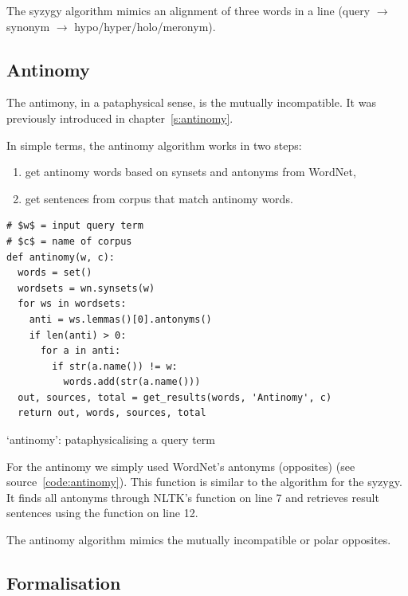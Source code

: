 The syzygy algorithm mimics an alignment of three words in a line (query $\to$ synonym $\to$ hypo/hyper/holo/meronym).


\subsection{Antinomy}
\label{s:antinomyalgo}

The antimony, in a pataphysical sense, is the mutually incompatible. It was previously introduced in chapter~\ref{s:antinomy}.

In simple terms, the antinomy algorithm works in two steps:
\begin{enumerate}
  \item get antinomy words based on synsets and antonyms from WordNet,
  \item get sentences from corpus that match antinomy words.
\end{enumerate}

\begin{listing}[!htbp] %
  \begin{verbatim}
# $w$ = input query term
# $c$ = name of corpus
def antinomy(w, c):
  words = set()
  wordsets = wn.synsets(w)
  for ws in wordsets:
    anti = ws.lemmas()[0].antonyms()
    if len(anti) > 0:
      for a in anti:
        if str(a.name()) != w:
          words.add(str(a.name()))
  out, sources, total = get_results(words, 'Antinomy', c)
  return out, words, sources, total
  \end{verbatim}
\caption[`antinomy' function]{`antinomy': pataphysicalising a query term}
\label{code:antinomy}
\end{listing}

For the antinomy we simply used WordNet's antonyms (opposites) (see source~\ref{code:antinomy}). This function is similar to the algorithm for the syzygy. It finds all antonyms through \ac{NLTK}'s  function on line 7 and retrieves result sentences using the  function on line 12.

The antinomy algorithm mimics the mutually incompatible or polar opposites.


\subsection{Formalisation}
\label{s:formalisation}

